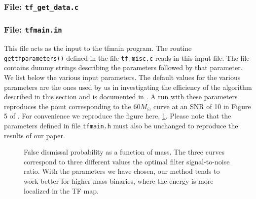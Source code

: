 \newpage
\subsubsection{File: \tt tf\_get\_data.c}

\subsubsection{File: \tt tfmain.in}

This file acts as the input to the tfmain program. The routine
{\tt gettfparameters()} defined in the file {\tt tf\_misc.c}
reads in this input file. The file contains dummy strings describing the parameters
followed by that parameter. We list below the various input
parameters. The default values for the various parameters are the
ones used by us in investigating the efficiency of the algorithm
described in this section and is documented in \cite{timefreqpap}.
A run with these parameters reproduces the  point 
corresponding to the $60M_\odot$ curve at an SNR of 10 in Figure 5 of 
\cite{timefreqpap}. For convenience we reproduce the figure here, \ref{f:disvsmass}.
Please note that the parameters defined in file
{\tt tfmain.h} must also be unchanged to reproduce the results of our paper.
\begin{figure}[htbp]
\begin{center}
\caption{ \label{f:disvsmass}
False dismissal probability as a function of mass. The three curves
correspond to three different values the optimal filter signal-to-noise ratio.
With the parameters we have chosen, our method tends to work better for higher
mass binaries, where the energy is more localized in the TF map.
 }
\end{center}
\end{figure}


